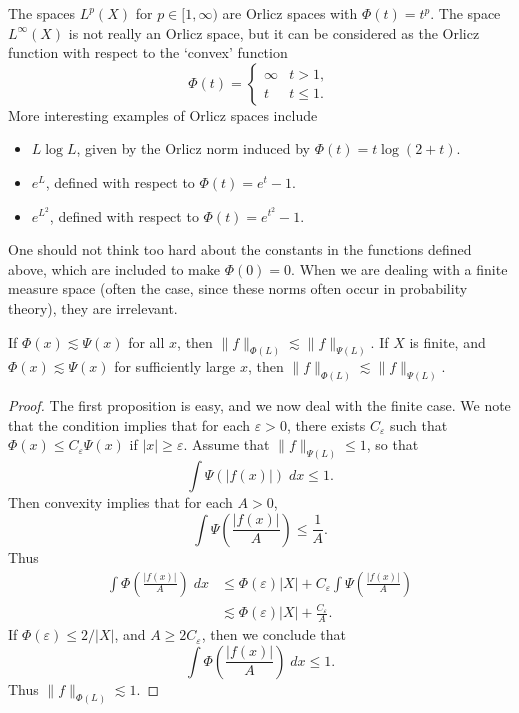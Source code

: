 The spaces $L^p(X)$ for $p \in [1,\infty)$ are Orlicz spaces with $\Phi(t) = t^p$. The space $L^\infty(X)$ is not really an Orlicz space, but it can be considered as the Orlicz function with respect to the `convex' function
%
\[ \Phi(t) = \begin{cases} \infty & t > 1, \\ t & t \leq 1. \end{cases} \]
%
More interesting examples of Orlicz spaces include
%
\begin{itemize}
    \item $L \log L$, given by the Orlicz norm induced by $\Phi(t) = t \log(2 + t)$.
    \item $e^L$, defined with respect to $\Phi(t) = e^t - 1$.
    \item $e^{L^2}$, defined with respect to $\Phi(t) = e^{t^2} - 1$.
\end{itemize}
%
One should not think too hard about the constants in the functions defined above, which are included to make $\Phi(0) = 0$. When we are dealing with a finite measure space (often the case, since these norms often occur in probability theory), they are irrelevant.

\begin{lemma}
  If $\Phi(x) \lesssim \Psi(x)$ for all $x$, then $\| f \|_{\Phi(L)} \lesssim \| f \|_{\Psi(L)}$. If $X$ is finite, and $\Phi(x) \lesssim \Psi(x)$ for sufficiently large $x$, then $\| f \|_{\Phi(L)} \lesssim \| f \|_{\Psi(L)}$.
\end{lemma}
\begin{proof}
  The first proposition is easy, and we now deal with the finite case. We note that the condition implies that for each $\varepsilon > 0$, there exists $C_\varepsilon$ such that $\Phi(x) \leq C_\varepsilon \Psi(x)$ if $|x| \geq \varepsilon$. Assume that $\| f \|_{\Psi(L)} \leq 1$, so that
  \[ \int \Psi(|f(x)|)\; dx \leq 1. \]
  Then convexity implies that for each $A > 0$,
  \[ \int \Psi \left( \frac{|f(x)|}{A} \right) \leq \frac{1}{A}. \]
  Thus
  \begin{align*}
    \int \Phi\left( \frac{|f(x)|}{A} \right)\; dx &\leq \Phi(\varepsilon) |X| + C_\varepsilon \int \Psi \left( \frac{|f(x)|}{A} \right)\\
    &\lesssim \Phi(\varepsilon) |X| + \frac{C_\varepsilon}{A}.
  \end{align*}
  If $\Phi(\varepsilon) \leq 2/|X|$, and $A \geq 2C_\varepsilon$, then we conclude that
  \[ \int \Phi\left( \frac{|f(x)|}{A} \right)\; dx \leq 1. \]
  Thus $\| f \|_{\Phi(L)} \lesssim 1$.
\end{proof}


